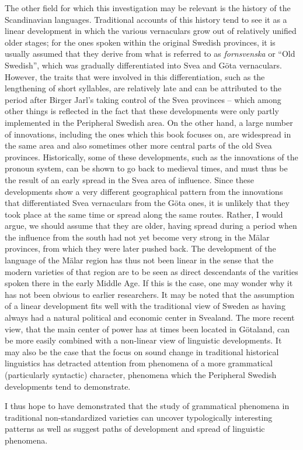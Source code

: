 The other field for which this investigation may be relevant is the history of the Scandinavian languages. Traditional accounts of this history tend to see it as a linear development in which the various vernaculars grow out of relatively unified older stages; for the ones spoken within the original Swedish provinces, it is usually assumed that they derive from what is referred to as \textit{fornsvenska} or “Old Swedish”, which was gradually differentiated into Svea and Göta vernaculars. However, the traits that were involved in this differentiation, such as the lengthening of short syllables, are relatively late and can be attributed to the period after Birger Jarl’s taking control of the Svea provinces – which among other things is reflected in the fact that these developments were only partly implemented in the Peripheral Swedish area. On the other hand, a large number of innovations, including the ones which this book focuses on, are widespread in the same area and also sometimes other more central parts of the old Svea provinces. Historically, some of these developments, such as the innovations of the pronoun system, can be shown to go back to medieval times, and must thus be the result of an early spread in the Svea area of influence. Since these developments show a very different geographical pattern from the innovations that differentiated Svea vernaculars from the Göta ones, it is unlikely that they took place at the same time or spread along the same routes. Rather, I would argue, we should assume that they are older, having spread during a period when the influence from the south had not yet become very strong in the Mälar provinces, from which they were later pushed back. The development of the language of the Mälar region has thus not been linear in the sense that the modern varieties of that region are to be seen as direct descendants of the varities spoken there in the early Middle Age. If this is the case, one may wonder why it has not been obvious to earlier researchers. It may be noted that the assumption of a linear development fits well with the traditional view of Sweden as having always had a natural political and economic center in Svealand. The more recent view, that the main center of power has at times been located in Götaland, can be more easily combined with a non-linear view of linguistic developments. It may also be the case that the focus on sound change in traditional historical linguistics has detracted attention from phenomena of a more grammatical (particularly syntactic) character, phenomena which the Peripheral Swedish developments tend to demonstrate.

I thus hope to have demonstrated that the study of grammatical phenomena in traditional non-standardized varieties can uncover typologically interesting patterns as well as suggest paths of development and spread of linguistic phenomena. 

